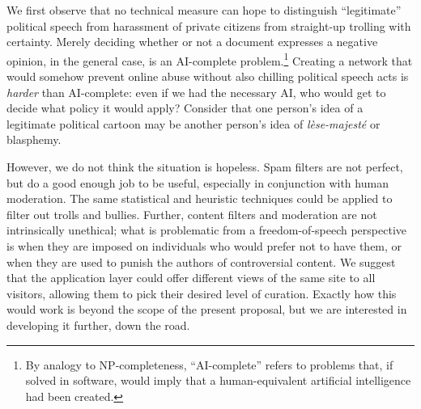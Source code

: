 \documentclass[twoside]{zarticle}
\begin{document}
We first observe that no technical measure can hope to distinguish
“legitimate” political speech from harassment of private citizens from
straight-up trolling with certainty.  Merely deciding whether or not a
document expresses a negative opinion, in the general case, is an
AI-complete problem.\footnote{By analogy to NP-completeness,
  “AI-complete” refers to problems that, if solved in software, would
  imply that a human-equivalent artificial intelligence had been
  created.}  Creating a network that would somehow prevent online
abuse without also chilling political speech acts is \emph{harder}
than AI-complete: even if we had the necessary AI, who would get to
decide what policy it would apply?  Consider that one person's idea of
a legitimate political cartoon may be another person's idea of
\textit{lèse-majesté} or blasphemy.

However, we do not think the situation is hopeless.  Spam filters are
not perfect, but do a good enough job to be useful, especially in
conjunction with human moderation.  The same statistical and heuristic
techniques could be applied to filter out trolls and bullies.
Further, content filters and moderation are not intrinsically
unethical; what is problematic from a freedom-of-speech perspective is
when they are imposed on individuals who would prefer not to have
them, or when they are used to punish the authors of controversial
content.  We suggest that the application layer could offer different
views of the same site to all visitors, allowing them to pick their
desired level of curation.  Exactly how this would work is beyond the
scope of the present proposal, but we are interested in developing it
further, down the road.

\printbibliography
\end{document}

